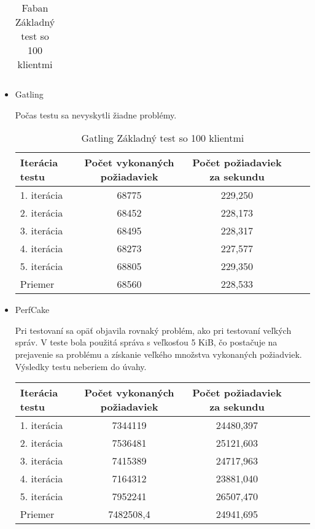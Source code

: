 \documentclass[12pt,oneside,final]{fithesis-utf8}
\begin{document}
\begin{itemize}
\begin{table}[H]
\begin{center}
\begin{tabular}{ | l | c | c | c | c |}
\end{tabular}
\end{center}
\caption{Faban Základný test so 100 klientmi}
\end{table}


\item Gatling

Počas testu sa nevyskytli žiadne problémy.

\begin{table}[H]
\begin{center}
\begin{tabular}{ | l | c | c | c | c |}
		\hline
		 \textbf{Iterácia testu} & \textbf{Počet vykonaných požiadaviek} & \textbf{Počet požiadaviek za sekundu} \\ \hline
		 1. iterácia & 68775 & 229,250 \\ \hline
		 2. iterácia & 68452 & 228,173 \\ \hline
		 3. iterácia & 68495 & 228,317 \\ \hline
		 4. iterácia & 68273 & 227,577 \\ \hline
		 5. iterácia & 68805 & 229,350 \\ \hline
		 Priemer & 68560 & 228,533 \\ \hline
		 
\end{tabular}
\end{center}
\caption{Gatling Základný test so 100 klientmi}
\end{table}


\item PerfCake

Pri testovaní sa opäť objavila rovnaký problém, ako pri testovaní veľkých správ. V teste bola použitá správa s veľkosťou 5 KiB, čo postačuje na prejavenie sa problému a získanie veľkého množstva vykonaných požiadviek. Výsledky testu neberiem do úvahy.

\begin{table}[H]
\begin{center}
\begin{tabular}{ | l | c | c | c | c |}
		\hline
		 \textbf{Iterácia testu} & \textbf{Počet vykonaných požiadaviek} & \textbf{Počet požiadaviek za sekundu} \\ \hline
		 1. iterácia & 7344119 & 24480,397 \\ \hline
		 2. iterácia & 7536481 & 25121,603 \\ \hline
		 3. iterácia & 7415389 & 24717,963 \\ \hline
		 4. iterácia & 7164312 & 23881,040 \\ \hline
		 5. iterácia & 7952241 & 26507,470 \\ \hline
		 Priemer & 7482508,4 & 24941,695 \\ \hline
		 

\end{tabular}
\end{center}
\end{table}
\end{itemize}
\end{document}
